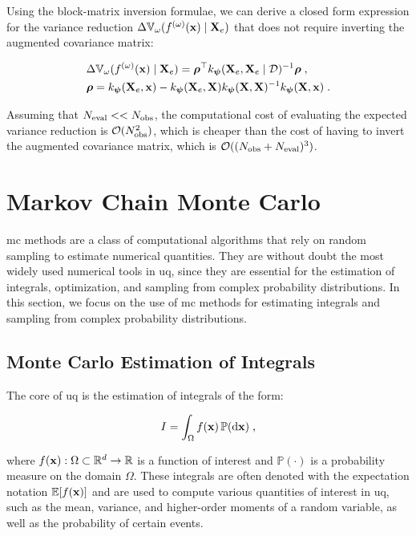 Using the block-matrix inversion formulae, we can derive a closed form expression for the variance reduction $\Delta \mathbb{V}_{\omega}(f^{(\omega)}(\mathbf{x}) \mid \mathbf{X}_e)$ that does not require inverting the augmented covariance matrix:

\begin{equation}
\left.
\begin{aligned}
    &\Delta \mathbb{V}_{\omega}(f^{(\omega)}(\mathbf{x}) \mid \mathbf{X}_e) = \boldsymbol{\rho}^{\top} k_{\boldsymbol{\psi}}(\mathbf{X}_e, \mathbf{X}_e \mid \mathcal{D})^{-1} \boldsymbol{\rho}\;,\\
    &\boldsymbol{\rho} = k_{\boldsymbol{\psi}}(\mathbf{X}_e, \mathbf{x}) - k_{\boldsymbol{\psi}}(\mathbf{X}_e, \mathbf{X}) k_{\boldsymbol{\psi}}(\mathbf{X}, \mathbf{X})^{-1} k_{\boldsymbol{\psi}}(\mathbf{X}, \mathbf{x})\;.
\end{aligned}
\right.
\end{equation}

Assuming that $N_{\mathrm{eval}} << N_{\mathrm{obs}}$, the computational cost of evaluating the expected variance reduction is $\mathcal{O}(N_{\mathrm{obs}}^2)$, which is cheaper than the cost of having to invert the augmented covariance matrix, which is $\mathcal{O}((N_{\mathrm{obs}} + N_{\mathrm{eval}})^3)$.

\section{Markov Chain Monte Carlo}
\label{sec:ntools:mcmc}

\gls{mc} methods are a class of computational algorithms that rely on random sampling to estimate numerical quantities. They are without doubt the most widely used numerical tools in \gls{uq}, since they are essential for the estimation of integrals, optimization, and sampling from complex probability distributions. In this section, we focus on the use of \gls{mc} methods for estimating integrals and sampling from complex probability distributions.

\subsection{Monte Carlo Estimation of Integrals}
\label{sec:ntools:mcmc:mc}

The core of \gls{uq} is the estimation of integrals of the form:

\begin{equation}
  I = \int_{\Omega} f(\mathbf{x})\, \mathbb{P}(\text{d} \mathbf{x})\;,
  \label{eq:integral}
\end{equation}

where $f(\mathbf{x}): \Omega \subset \mathbb{R}^d \to \mathbb{R}$ is a function of interest and $\mathbb{P}( \cdot)$ is a probability measure on the domain $\Omega$. These integrals are often denoted with the expectation notation $\mathbb{E}[f(\mathbf{x})]$ and are used to compute various quantities of interest in \gls{uq}, such as the mean, variance, and higher-order moments of a random variable, as well as the probability of certain events.

